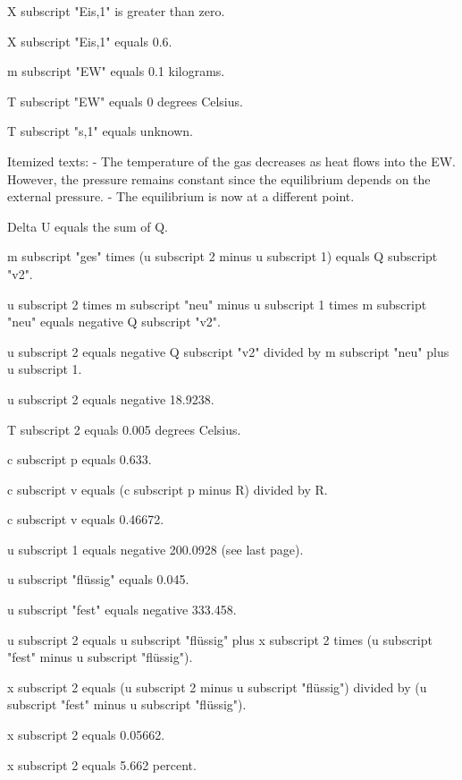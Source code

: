 X subscript "Eis,1" is greater than zero.

X subscript "Eis,1" equals 0.6.

m subscript "EW" equals 0.1 kilograms.

T subscript "EW" equals 0 degrees Celsius.

T subscript "s,1" equals unknown.

Itemized texts:
- The temperature of the gas decreases as heat flows into the EW. However, the pressure remains constant since the equilibrium depends on the external pressure.
- The equilibrium is now at a different point.

Delta U equals the sum of Q.

m subscript "ges" times (u subscript 2 minus u subscript 1) equals Q subscript "v2".

u subscript 2 times m subscript "neu" minus u subscript 1 times m subscript "neu" equals negative Q subscript "v2".

u subscript 2 equals negative Q subscript "v2" divided by m subscript "neu" plus u subscript 1.

u subscript 2 equals negative 18.9238.

T subscript 2 equals 0.005 degrees Celsius.

c subscript p equals 0.633.

c subscript v equals (c subscript p minus R) divided by R.

c subscript v equals 0.46672.

u subscript 1 equals negative 200.0928 (see last page).

u subscript "flüssig" equals 0.045.

u subscript "fest" equals negative 333.458.

u subscript 2 equals u subscript "flüssig" plus x subscript 2 times (u subscript "fest" minus u subscript "flüssig").

x subscript 2 equals (u subscript 2 minus u subscript "flüssig") divided by (u subscript "fest" minus u subscript "flüssig").

x subscript 2 equals 0.05662.

x subscript 2 equals 5.662 percent.